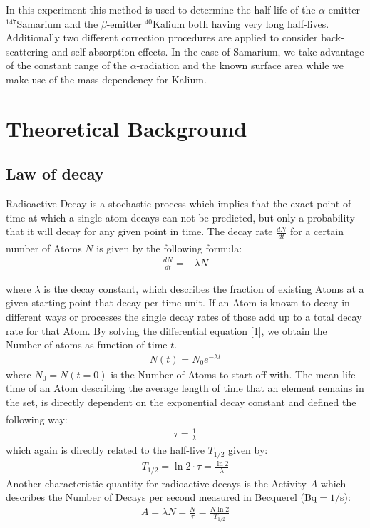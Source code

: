 \documentclass[12pt]{article}
\begin{document}
In this experiment this method is used to determine the half-life of the $\alpha$-emitter ${}^{147}$Samarium and the $\beta$-emitter ${}^{40}$Kalium both having very long half-lives. Additionally two different correction procedures are applied to consider back-scattering and self-absorption effects. 
In the case of Samarium, we take advantage of the constant range of the  $\alpha$-radiation and the known surface area while we make use of the mass dependency for Kalium.











\newpage
\section{Theoretical Background}

\subsection{Law of decay}\label{zerfallsgesetz}

Radioactive Decay is a stochastic process which implies that the exact point of time at which a single atom decays can not be predicted, but only a probability that it will decay for any given point in time.  
The decay rate $\frac{dN}{dt}$ for a certain number of Atoms $N$ is given by the following formula:\textsuperscript{\cite{dem}}
\begin{align}
\frac{dN}{dt}=-\lambda N \label{1}
\end{align}

where $\lambda$ is the decay constant, which describes the fraction of existing Atoms at a given starting point that decay per time unit.
If an Atom is known to decay in different ways or processes the single decay rates of those add up to a total decay rate for that Atom.
By solving the differential equation \ref{1}, we obtain the Number of atoms as function of time $t$.
\begin{align}
N(t)=N_0e^{-\lambda t}
\end{align}
where $N_0=N(t=0)$ is the Number of Atoms to start off with.
The mean life-time of an Atom describing the average length of time that an element remains in the set, is directly dependent on the exponential decay constant and defined the following way:\textsuperscript{\cite{dem}}
\begin{align}
\tau=\frac{1}{\lambda}
\end{align}
which again is directly related to the half-live $T_{1/2}$ given by:
\begin{align}
T_{1/2} = \ln2\cdot \tau = \frac{\ln2}{\lambda}
\end{align}
Another characteristic quantity for radioactive decays is the Activity $A$ which describes the Number of Decays per second measured in Becquerel (Bq$=1/$s):
\begin{align}
A = \lambda N = \frac{N}{\tau} = \frac{N\ln2}{T_{1/2}}\label{activity}
\end{align}
\end{document}
